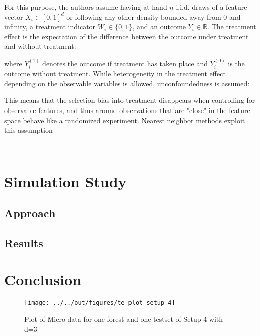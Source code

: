 \documentclass[11pt, a4paper, leqno]{article}
\begin{document}
For this purpose, the authors assume having at hand \(n\) i.i.d. draws of a feature vector \(X_i \in [0,1]^d\) or following any other density bounded away from 0 and infinity, a treatment indicator \(W_i \in \{0,1\}\), and an outcome \(Y_i \in \mathbb{R}\).
The treatment effect is the expectation of the difference between the outcome under treatment and without treatment:

where \(Y_i^{(1)}\) denotes the outcome if treatment has taken place and \(Y_i^{(0)}\) is the outcome without treatment.
While heterogeneity in the treatment effect depending on the observable variables is allowed, unconfoundedness is assumed:

This means that the selection bias into treatment disappears when controlling for observable features, and thus around observations that are "close" in the feature space behave like a randomized experiment. Nearest neighbor methods exploit this assumption
\(\) \(\) \(\) 







 \(\) \(\) \(\) \(\) \(\) 


\section{Simulation Study} %
\label{sec:simulation}

\subsection{Approach} %
\label{sec:sim_approach}



\subsection{Results} %
\label{sec:sim_results}
    






\section{Conclusion} %
\label{sec:conclusion}

\begin{figure}
    \caption{Plot of Micro data for one forest and one testset of Setup 4 with d=3}
    
    \texttt{[image: ../../out/figures/te\_plot\_setup\_4]}

\end{figure}




\pagebreak










\end{document}
